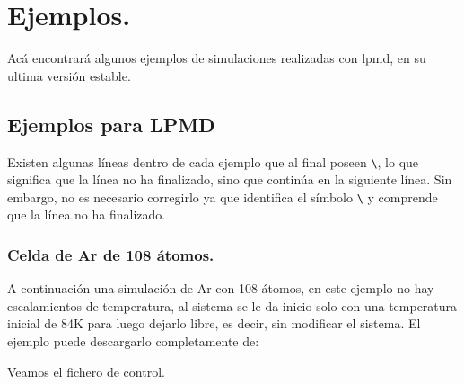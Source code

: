 \chapter{Ejemplos.}
\label{chap:exa}

Ac\'a encontrar\'a algunos ejemplos de simulaciones realizadas con lpmd, en su ultima versi\'on estable.

\section{Ejemplos para LPMD}

Existen algunas l\'ineas dentro de cada ejemplo que al final poseen \verb|\|, lo que significa que la l\'inea no ha finalizado, sino que contin\'ua en la siguiente l\'inea. Sin embargo, no es necesario corregirlo ya que \lpmd identifica el s\'imbolo \verb|\| y comprende que la l\'inea no ha finalizado.

\subsection{Celda de Ar de 108 \'atomos.}

A continuaci\'on una simulaci\'on de Ar con 108 \'atomos, en este ejemplo no hay escalamientos de temperatura, al sistema se le da inicio solo con una temperatura inicial de 84K para luego dejarlo libre, es decir, sin modificar el sistema. El ejemplo puede descargarlo completamente de:


Veamos el fichero de control.


